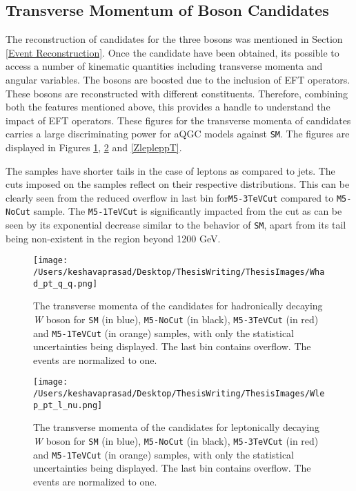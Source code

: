 \subsection{Transverse Momentum of Boson Candidates}
The reconstruction of candidates for the three bosons was mentioned in Section \ref{Event Reconstruction}. Once the candidate have been obtained, its possible to access a number of kinematic quantities including transverse momenta and angular variables. The bosons are boosted due to the inclusion of EFT operators. These bosons are reconstructed with different constituents. Therefore, combining both the features mentioned above, this provides a handle to understand the impact of EFT operators. These figures for the transverse momenta of candidates carries a large discriminating power for aQGC models against \texttt{SM}. The figures are displayed in Figures \ref{Whad-pT}, \ref{WLep-pT} and \ref{ZlepleppT}. 

The samples have shorter tails in the case of leptons as compared to jets. The cuts imposed on the samples reflect on their respective distributions. This can be clearly seen from the reduced overflow in last bin for\texttt{M5-3TeVCut} compared to \texttt{M5-NoCut} sample. The  \texttt{M5-1TeVCut} is significantly impacted from the cut as can be seen by its exponential decrease similar to the behavior of \texttt{SM}, apart from its tail being non-existent in the region beyond 1200 GeV.
\begin{figure}[!htb]
	\centering
	\texttt{[image: /Users/keshavaprasad/Desktop/ThesisWriting/ThesisImages/Whad\_pt\_q\_q.png]}
	\caption{The transverse momenta of the candidates for hadronically decaying \textit{W} boson for \texttt{SM} (in blue), \texttt{M5-NoCut} (in black), \texttt{M5-3TeVCut} (in red) and \texttt{M5-1TeVCut} (in orange) samples, with only the statistical uncertainties being displayed. The last bin contains overflow. The events are normalized to one.}
	\label{Whad-pT}
\end{figure}

\begin{figure}[!htb]
	\centering
	\texttt{[image: /Users/keshavaprasad/Desktop/ThesisWriting/ThesisImages/Wlep\_pt\_l\_nu.png]}
	\caption{The transverse momenta of the candidates for leptonically decaying \textit{W} boson for \texttt{SM} (in blue), \texttt{M5-NoCut} (in black), \texttt{M5-3TeVCut} (in red) and \texttt{M5-1TeVCut} (in orange) samples, with only the statistical uncertainties being displayed. The last bin contains overflow. The events are normalized to one.}
	\label{WLep-pT}
\end{figure}

